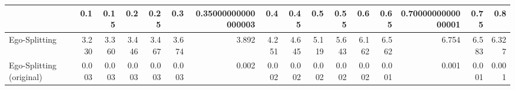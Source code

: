 \begin{tabular}{lrrrrrrrrrrrrrrr}
\toprule
{} &   0.1 &  0.15 &   0.2 &  0.25 &   0.3 & 0.35000000000000003 &   0.4 &  0.45 &   0.5 &  0.55 &   0.6 &  0.65 & 0.7000000000000001 &  0.75 &   0.8 \\
\midrule
Ego-Splitting            & 3.230 & 3.360 & 3.446 & 3.467 & 3.674 &               3.892 & 4.251 & 4.645 & 5.119 & 5.643 & 6.162 & 6.562 &              6.754 & 6.583 & 6.327 \\
Ego-Splitting (original) & 0.003 & 0.003 & 0.003 & 0.003 & 0.003 &               0.002 & 0.002 & 0.002 & 0.002 & 0.002 & 0.002 & 0.001 &              0.001 & 0.001 & 0.001 \\
\bottomrule
\end{tabular}
